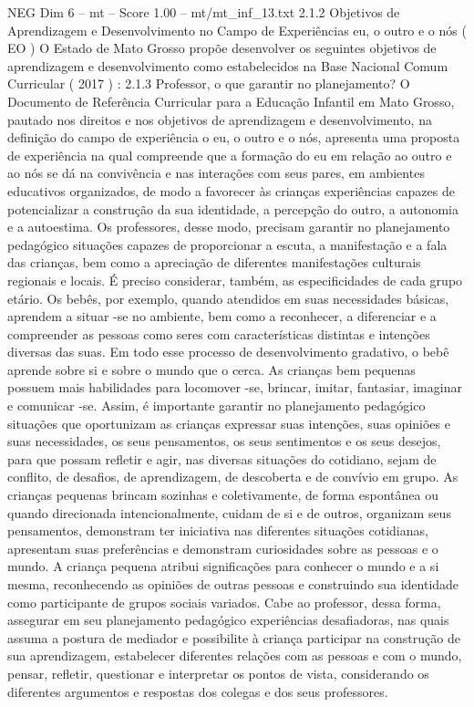 \begin{textsample}{NEG Dim 6 – mt – Score 1.00 – mt/mt\_inf\_13.txt}  \label{ex:f6_neg_122}
2.1.2 Objetivos de Aprendizagem e Desenvolvimento no Campo de Experiências eu, o outro e o nós ( EO ) O Estado de Mato Grosso propõe desenvolver os seguintes objetivos de aprendizagem e desenvolvimento como estabelecidos na Base Nacional Comum Curricular ( 2017 ) : 2.1.3 Professor, o que garantir no planejamento?
O Documento de Referência Curricular para a Educação Infantil em Mato Grosso, pautado nos direitos e nos objetivos de aprendizagem e desenvolvimento, na definição do campo de experiência o eu, o outro e o nós, apresenta uma proposta de experiência na qual compreende que a formação do eu em relação ao outro e ao nós se dá na convivência e nas interações com seus pares, em ambientes educativos organizados, de modo a favorecer às crianças experiências capazes de potencializar a construção da sua identidade, a percepção do outro, a autonomia e a autoestima.
Os professores, desse modo, precisam garantir no planejamento pedagógico situações capazes de proporcionar a escuta, a manifestação e a fala das crianças, bem como a apreciação de diferentes manifestações culturais regionais e locais.
É preciso considerar, também, as especificidades de cada grupo etário.
Os bebês, por exemplo, quando atendidos em suas necessidades básicas, aprendem a situar -se no ambiente, bem como a reconhecer, a diferenciar e a compreender as pessoas como seres com características distintas e intenções diversas das suas.
Em todo esse processo de desenvolvimento gradativo, o bebê aprende sobre si e sobre o mundo que o cerca.
As crianças bem pequenas possuem mais habilidades para locomover -se, brincar, imitar, fantasiar, imaginar e comunicar -se.
Assim, é importante garantir no planejamento pedagógico situações que oportunizam as crianças expressar suas intenções, suas opiniões e suas necessidades, os seus pensamentos, os seus sentimentos e os seus desejos, para que possam refletir e agir, nas diversas situações do cotidiano, sejam de conflito, de desafios, de aprendizagem, de descoberta e de convívio em grupo.
As crianças pequenas brincam sozinhas e coletivamente, de forma espontânea ou quando direcionada intencionalmente, cuidam de si e de outros, organizam seus pensamentos, demonstram ter iniciativa nas diferentes situações cotidianas, apresentam suas preferências e demonstram curiosidades sobre as pessoas e o mundo.
A criança pequena atribui significações para conhecer o mundo e a si mesma, reconhecendo as opiniões de outras pessoas e construindo sua identidade como participante de grupos sociais variados.
Cabe ao professor, dessa forma, assegurar em seu planejamento pedagógico experiências desafiadoras, nas quais assuma a postura de mediador e possibilite à criança participar na construção de sua aprendizagem, estabelecer diferentes relações com as pessoas e com o mundo, pensar, refletir, questionar e interpretar os pontos de vista, considerando os diferentes argumentos e respostas dos colegas e dos seus professores.

\end{textsample}
